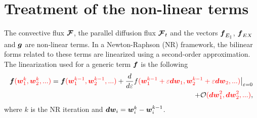 \documentclass[a4paper,10pt]{article}
\newcommand{\bm}[1]{\text{\boldmath$#1$\unboldmath}}
\newcommand{\SecOrdTens}[1]{\bm{\mathcal{#1}}}
\newcommand{\F}{\SecOrdTens{F}}
\newcommand{\fo}[1]{{ \color{red} ( #1 )\color{black} }} %
\begin{document}
\section{Treatment of the non-linear terms}
The convective flux $\F$, the parallel diffusion flux $\F_t$ and the vectors $\bm{f}_{E_{\parallel}}$, $\bm{f}_{EX}$ and $\bm{g}$ are non-linear terms. In a Newton-Raphson (NR) framework, the bilinear forms related to these terms are linearized using a second-order approximation. The linearization used for a generic term $\bm{f}$  is the following
\begin{equation}\label{eq:linearization}
\begin{split}
 \bm{f}\fo{\bm{w}_1^k,\bm{w}_2^k,...} = \bm{f}\fo{\bm{w}_1^{k-1},\bm{w}_2^{k-1},...} + \frac{d}{d\varepsilon}f\fo{\bm{w}_1^{k-1}+\varepsilon \bm{dw}_1,\bm{w}_2^{k-1}+\varepsilon \bm{dw}_2,...}\big|_{\varepsilon=0} \\ + \mathcal{O}\fo{\bm{dw}_1^2,\bm{dw}_2^2,...},
\end{split}
\end{equation}
where $k$ is the NR iteration and $\bm{dw}_i = \bm{w}_i^k-\bm{w}_i^{k-1}$.
% 
\end{document}
